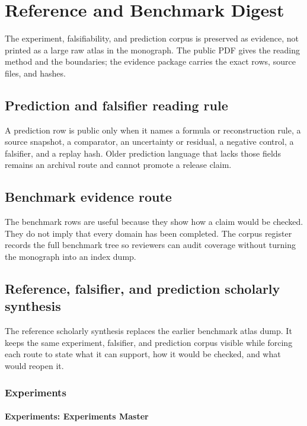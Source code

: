 \section{Reference and Benchmark Digest}

\label{sec:oc-core-1-3-reference-benchmark-atlas}

The experiment, falsifiability, and prediction corpus is preserved as evidence, not printed as a large raw atlas in the monograph. The public PDF gives the reading method and the boundaries; the evidence package carries the exact rows, source files, and hashes.


\subsection{Prediction and falsifier reading rule}

A prediction row is public only when it names a formula or reconstruction rule, a source snapshot, a comparator, an uncertainty or residual, a negative control, a falsifier, and a replay hash. Older prediction language that lacks those fields remains an archival route and cannot promote a release claim.


\subsection{Benchmark evidence route}

The benchmark rows are useful because they show how a claim would be checked. They do not imply that every domain has been completed. The corpus register records the full benchmark tree so reviewers can audit coverage without turning the monograph into an index dump.


\subsection{Reference, falsifier, and prediction scholarly synthesis}

The reference scholarly synthesis replaces the earlier benchmark atlas dump. It keeps the same experiment, falsifier, and prediction corpus visible while forcing each route to state what it can support, how it would be checked, and what would reopen it.


\subsubsection{Experiments}

\paragraph{Experiments: Experiments Master}

